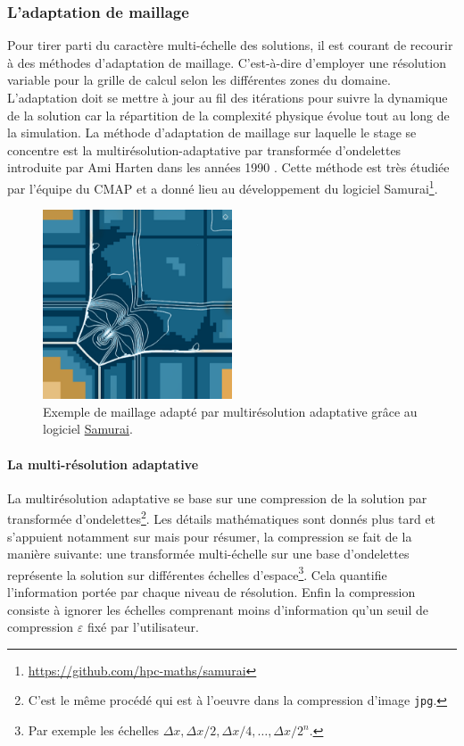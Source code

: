     \subsubsection{L'adaptation de maillage}
    Pour tirer parti du caractère multi-échelle des solutions, il est courant de recourir à des méthodes d'adaptation de maillage.
    C'est-à-dire d'employer une résolution variable pour la grille de calcul selon les différentes zones du domaine. 
    L'adaptation doit se mettre à jour au fil des itérations pour suivre la dynamique de la solution car la répartition de la complexité physique évolue tout au long de la simulation.
    La méthode d'adaptation de maillage sur laquelle le stage se concentre est la multirésolution-adaptative par transformée d'ondelettes introduite par Ami Harten dans les années 1990 \cite{harten1994}.
    Cette méthode est très étudiée par l'équipe du CMAP et a donné lieu au développement du logiciel Samurai\footnote{\href{https://github.com/hpc-maths/samurai}{https://github.com/hpc-maths/samurai}}.
    \begin{figure}[h]
    \centering
    \includegraphics[width=0.5\textwidth]{media/3_/3_/exemple_compression_samurai.png}
    \caption{Exemple de maillage adapté par multirésolution adaptative grâce au logiciel \href{https://github.com/hpc-maths/samurai}{Samurai}.}
    \label{fig:samurai}
    \end{figure}

        \paragraph{La multi-résolution adaptative}
        La multirésolution adaptative se base sur une compression de la solution par transformée d'ondelettes\footnote{C'est le même procédé qui est à l'oeuvre dans la compression d'image \texttt{jpg}.}.
        Les détails mathématiques sont donnés plus tard et s'appuient notamment sur \cite{postePoly} mais pour résumer, la compression se fait de la manière suivante:
        une transformée multi-échelle sur une base d'ondelettes représente la solution sur différentes échelles d'espace\footnote{Par exemple les échelles $\Delta x, \Delta x/2,\Delta x/4,\dots, \Delta x/2^n$.}. 
        Cela quantifie l'information portée par chaque niveau de résolution. Enfin la compression consiste à ignorer les échelles comprenant moins d'information
        qu'un seuil de compression $\varepsilon$ fixé par l'utilisateur.

